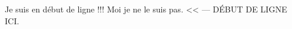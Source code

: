 \begin{pseudoverb}
    Je suis en début de ligne !!!
    Moi je ne le suis pas.
<< --- DÉBUT DE LIGNE ICI.
\end{pseudoverb} 
